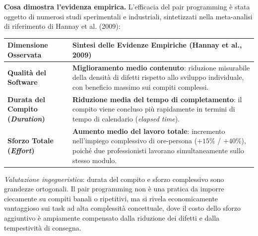 \documentclass[12pt]{extarticle}
\begin{document}
\noindent \textbf{Cosa dimostra l'evidenza empirica.}
L'efficacia del pair programming è stata oggetto di numerosi studi sperimentali e industriali, sintetizzati nella meta-analisi di riferimento di Hannay et al. (2009):

\begin{center}
\small
\begin{tabular}{p{3.8cm}p{10.2cm}}
    \toprule
    \textbf{Dimensione Osservata} & \textbf{Sintesi delle Evidenze Empiriche (Hannay et al., 2009)} \\
    \midrule
    \textbf{Qualità del Software} & \textbf{Miglioramento medio contenuto}: riduzione misurabile della densità di difetti rispetto allo sviluppo individuale, con beneficio massimo sui compiti complessi. \\
    \addlinespace
    \textbf{Durata del Compito (\textit{Duration})} & \textbf{Riduzione media del tempo di completamento}: il compito viene concluso più rapidamente in termini di tempo di calendario (\textit{elapsed time}). \\
    \addlinespace
    \textbf{Sforzo Totale (\textit{Effort})} & \textbf{Aumento medio del lavoro totale}: incremento nell'impiego complessivo di ore-persona ($+15\%$ / $+40\%$), poiché due professionisti lavorano simultaneamente sullo stesso modulo. \\
    \bottomrule
\end{tabular}
\end{center}

\noindent \textit{Valutazione ingegneristica}: durata del compito e sforzo complessivo sono grandezze ortogonali. Il pair programming non è una pratica da imporre ciecamente su compiti banali o ripetitivi, ma si rivela economicamente vantaggioso sui task ad alta complessità concettuale, dove il costo dello sforzo aggiuntivo è ampiamente compensato dalla riduzione dei difetti e dalla tempestività di consegna.
\end{document}
